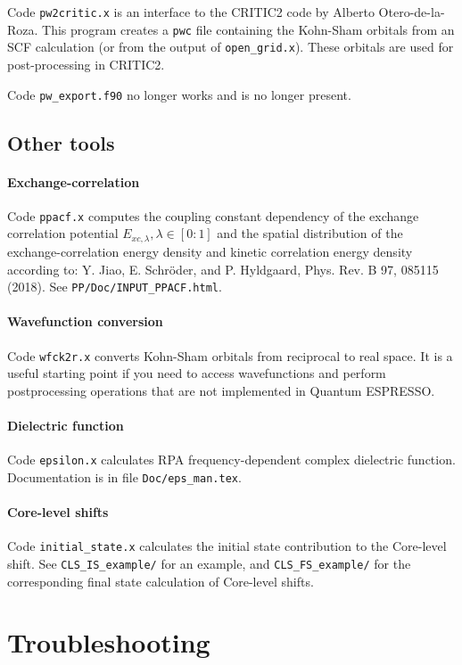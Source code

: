\documentclass[12pt,a4paper]{article}
\def\qe{{\sc Quantum ESPRESSO}}
\begin{document}
Code \texttt{pw2critic.x} is an interface to the CRITIC2 code by
Alberto Otero-de-la-Roza. This program creates a \texttt{pwc} file
containing the Kohn-Sham orbitals from an SCF calculation (or from the
output of \texttt{open\_grid.x}). These orbitals are used for
post-processing in CRITIC2.

Code \texttt{pw\_export.f90} no longer works and is no longer present.

\subsection{Other tools}

\paragraph{Exchange-correlation}
Code \texttt{ppacf.x} computes the coupling constant dependency of the
exchange correlation potential $E_{xc,\lambda}, \lambda \in [0:1]$
and the spatial distribution of the exchange-correlation energy density
and kinetic correlation energy density according to:
Y. Jiao, E. Schr\"oder, and P. Hyldgaard, Phys. Rev. B 97, 085115 (2018).
See \texttt{PP/Doc/INPUT\_PPACF.html}.

\paragraph{Wavefunction conversion}
Code \texttt{wfck2r.x} converts Kohn-Sham orbitals from reciprocal to real 
space. It is a useful starting point if you need to access wavefunctions
and perform postprocessing operations that are not implemented in \qe.

\paragraph{Dielectric function}
Code \texttt{epsilon.x} calculates RPA frequency-dependent complex dielectric 
function. Documentation is in file \texttt{Doc/eps\_man.tex}.

\paragraph{Core-level shifts}
Code \texttt{initial\_state.x} calculates the initial state contribution
to the Core-level shift. See \texttt{CLS\_IS\_example/} for
an example, and \texttt{CLS\_FS\_example/} for the corresponding
final state calculation of Core-level shifts.

\section{Troubleshooting}
\end{document}
